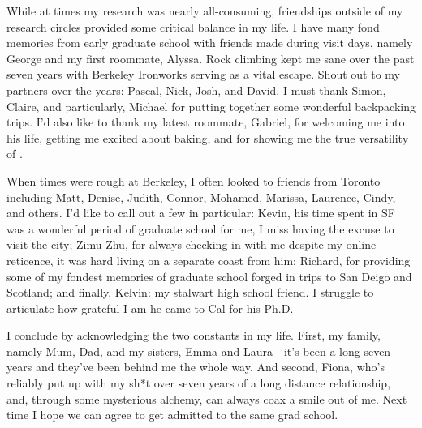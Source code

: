 While at times my research was nearly all-consuming, friendships outside of my
research circles provided some critical balance in my life. I have many fond
memories from early graduate school with friends made during visit days, namely
George and my first roommate, Alyssa. Rock climbing kept me sane over the past
seven years with Berkeley Ironworks serving as a vital escape. Shout out to
my partners over the years: Pascal, Nick, Josh, and David. I must thank Simon,
Claire, and particularly, Michael for putting together some wonderful
backpacking trips. I'd also like to thank my latest roommate, Gabriel, for
welcoming me into his life, getting me excited about baking, and for showing me
the true versatility of .

When times were rough at Berkeley, I often looked to friends from Toronto
including Matt, Denise, Judith, Connor, Mohamed, Marissa, Laurence, Cindy, and
others. I'd like to call out a few in particular: Kevin, his time spent in SF
was a wonderful period of graduate school for me, I miss having the excuse to
visit the city; Zimu Zhu, for always checking in with me despite my online
reticence, it was hard living on a separate coast from him; Richard, for
providing some of my fondest memories of graduate school forged in trips to San
Deigo and Scotland; and finally, Kelvin: my stalwart high school friend. I
struggle to articulate how grateful I am he came to Cal for his Ph.D.

I conclude by acknowledging the two constants in my life. First, my family,
namely Mum, Dad, and my sisters, Emma and Laura---it's been a long seven years
and they've been behind me the whole way. And second, Fiona, who's reliably put
up with my sh*t over seven years of a long distance relationship, and, through
some mysterious alchemy, can always coax a smile out of me. Next time I hope we
can agree to get admitted to the same grad school.
